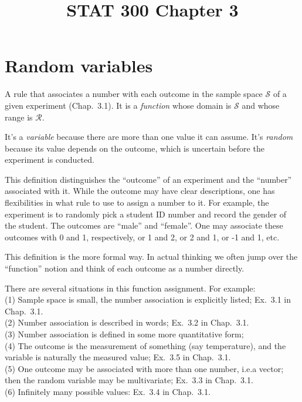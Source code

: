\documentclass[12pt]{article}
\begin{document}
\title{STAT 300 Chapter 3}
\maketitle

\section{Random variables}

\alert[Definition]%
A rule that associates a number with each outcome in the
sample space $\mathcal{S}$ of a given experiment
(Chap.~3.1).
It is a \emph{function} whose domain is $\mathcal{S}$ and whose range is
$\mathcal{R}$.

It's a \emph{variable} because there are more than one value it can
assume.
It's \emph{random} because its value depends on the outcome, which is
uncertain before the experiment is conducted.

This definition distinguishes the ``outcome'' of an experiment and the
``number'' associated with it. While the outcome may have clear
descriptions, one has flexibilities in what rule to use to assign a
number to it.
For example, the experiment is to randomly pick a student ID number and
record the gender of the student. The outcomes are ``male'' and
``female''.
One may associate these outcomes with 0 and 1, respectively,
or 1 and 2, or 2 and 1, or -1 and 1, etc.

This definition is the more formal way.
In actual thinking we often jump over the
``function'' notion and think of each outcome as a number directly.

There are several situations in this function assignment.
For example:\\
(1) Sample space is small, the number association is explicitly
listed; Ex.~3.1 in Chap.~3.1.\\
(2) Number association is described in words; Ex.~3.2 in Chap.~3.1.\\
(3) Number association is defined in some more quantitative form;\\
(4) The outcome is the measurement of something (say temperature),
and the variable is naturally the measured value;
Ex.~3.5 in Chap.~3.1.\\
(5) One outcome may be associated with more than one number,
i.e.\@ a vector; then the random variable may be multivariate;
Ex.~3.3 in Chap.~3.1.\\
(6) Infinitely many possible values: Ex.~3.4 in Chap.~3.1.
\end{document}
